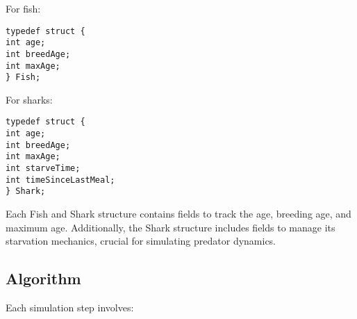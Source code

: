 \documentclass[conference,compsoc]{IEEEtran}
\begin{document}
For fish:
\begin{lstlisting}[style=CStyle]
typedef struct {
int age;
int breedAge;
int maxAge;
} Fish;
\end{lstlisting}

For sharks:
\begin{lstlisting}[style=CStyle]
typedef struct {
int age;
int breedAge;
int maxAge;
int starveTime;
int timeSinceLastMeal;
} Shark;
\end{lstlisting}

Each Fish and Shark structure contains fields to track the age, breeding age, and maximum age. Additionally, the Shark structure includes fields to manage its starvation mechanics, crucial for simulating predator dynamics.

\subsection{Algorithm}

Each simulation step involves: 
\end{document}
